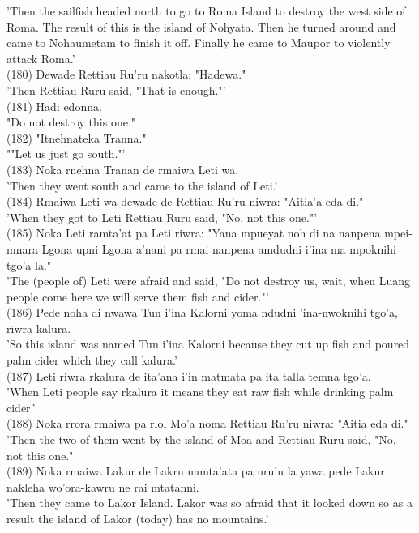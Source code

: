 \documentclass[10pt]{article}
\begin{document}
'Then the sailfish headed north to go to Roma Island to destroy the west side of Roma. The result of this is the island of Nohyata. Then he turned around and came to Nohaumetam to finish it off. Finally he came to Maupor to violently attack Roma.'\\
(180) Dewade Rettiau Ru'ru nakotla: "Hadewa."\\
'Then Rettiau Ruru said, "That is enough."'\\
(181) Hadi edonna.\\
"Do not destroy this one."\\
(182) "Itnehnateka Tranna."\\
""Let us just go south."'\\
(183) Noka rnehna Tranan de rmaiwa Leti wa.\\
'Then they went south and came to the island of Leti.'\\
(184) Rmaiwa Leti wa dewade de Rettiau Ru'ru niwra: "Aitia'a eda di."\\
'When they got to Leti Rettiau Ruru said, "No, not this one."'\\
(185) Noka Leti ramta'at pa Leti riwra: "Yana mpueyat noh di na nanpena mpei-mnara Lgona upni Lgona a'nani pa rmai nanpena amdudni i'ina ma mpoknihi tgo'a la."\\
'The (people of) Leti were afraid and said, "Do not destroy us, wait, when Luang people come here we will serve them fish and cider."'\\
(186) Pede noha di nwawa Tun i'ina Kalorni yoma ndudni 'ina-nwoknihi tgo'a, riwra kalura.\\
'So this island was named Tun i'ina Kalorni because they cut up fish and poured palm cider which they call kalura.'\\
(187) Leti riwra rkalura de ita'ana i'in matmata pa ita talla temna tgo'a.\\
'When Leti people say rkalura it means they eat raw fish while drinking palm cider.'\\
(188) Noka rrora rmaiwa pa rlol Mo'a noma Rettiau Ru'ru niwra: "Aitia eda di."\\
'Then the two of them went by the island of Moa and Rettiau Ruru said, "No, not this one."\\
(189) Noka rmaiwa Lakur de Lakru namta'ata pa nru'u la yawa pede Lakur nakleha wo'ora-kawru ne rai mtatanni.\\
'Then they came to Lakor Island. Lakor was so afraid that it looked down so as a result the island of Lakor (today) has no mountains.'\\
\end{document}
